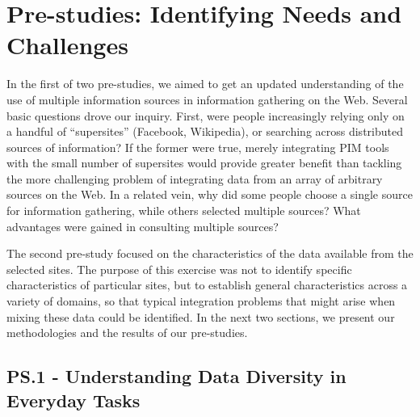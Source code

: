 \documentclass{sigchi}
\begin{document}
\section{Pre-studies: Identifying Needs and Challenges}

In the first of two pre-studies, we aimed to get an updated understanding of the use of multiple information sources in information gathering on the Web. Several basic questions drove our inquiry.  First, were people increasingly relying only on a handful of ``supersites'' (Facebook, Wikipedia), or searching across distributed sources of information?  If the former were true, merely integrating PIM tools with the small number of supersites would provide greater benefit than tackling the more challenging problem of integrating data from an array of arbitrary sources on the Web.  In a related vein, why did some people choose a single source for information gathering, while others selected multiple sources?  What advantages were gained in consulting multiple sources? 


The second pre-study focused on the characteristics of the data available from the selected sites. The purpose of this exercise was not to identify specific characteristics of particular sites, but to establish general characteristics across a variety of domains, so that typical integration problems that might arise when mixing these data could be identified.  In the next two sections, we present our methodologies and the results of our pre-studies.

\subsection{PS.1 - Understanding Data Diversity in Everyday Tasks}
\end{document}
